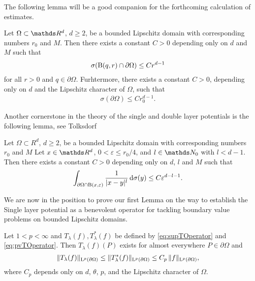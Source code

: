 The following lemma will be a good companion for the forthcoming calculation of estimates.
\begin{lem}
  \label{lem:compareBoundaryWithBall}
  Let $\Omega \subset \R^d$, $d \geq 2$, be a bounded Lipschitz domain with corresponding numbers $r_0$ and $M$.
  Then there exists a constant $C > 0$ depending only on $d$ and $M$ such that
  \begin{align*}
    \sigma(\mathrm{B}(q,r) \cap \partial\Omega) \leq C r^{d -1}
  \end{align*}
  for all $r > 0$ and $q \in \partial\Omega$.
  Furhtermore, there exists a constant $C > 0$, depending only on $d$ and the Lipschitz character of $\Omega$, such that
  \begin{align*}
    \sigma(\partial\Omega) \leq C r_0^{d - 1}.
\end{align*}
\end{lem}

Another cornerstone in the theory of the single and double layer potentials is the following lemma, see Tolksdorf \cite[Lem. 4.3.2]{tolksdorf}

\begin{lem}
  \label{lem:central}
  Let $\Omega \subset R^d$, $d \geq 2$, be a bounded Lipschitz domain with corresponding numbers $r_0$ and $M$
  Let $x \in \R^d$, $0 < \varepsilon \leq r_0/4$, and $l \in \N_0$ with $l < d - 1$.
  Then there exists a constant $C > 0$ depending only on $d$, $l$ and $M$ such that
  \begin{align*}
    \int_{\partial\Omega \cap \mathrm{B}(x, \varepsilon)} \frac{1}{|x - y|^l} \, {\operatorname{d}\!{\sigma}}(y) \leq C \varepsilon^{d - l - 1}.
  \end{align*}
\end{lem}

We are now in the position to prove our first Lemma on the way to establish the Single layer potential as a benevolent operator for tackling boundary value problems on bounded Lipschitz domains.

\begin{lem}
  \label{lem:lpBoundednessT}
  Let $1 < p < \infty$ and $T_\lambda(f), T_\lambda^*(f)$ be defined by \eqref{eq:supTOperator} and \eqref{eq:pvTOperator}.
  Then $T_\lambda(f)(P)$ exists for almost everywhere $P \in \partial\Omega$ and
  \begin{align}
    \label{eq:lpBoundednessT}
    \|T_\lambda(f) \|_{\mathrm{L}^p(\partial\Omega)}
    \leq \|T_\lambda^*(f) \|_{\mathrm{L}^p(\partial\Omega)}
    \leq C_p \, \|f\|_{\mathrm{L}^p(\partial\Omega)},
  \end{align}
  where $C_p$ depends only on $d$, $\theta$, $p$, and the Lipschitz character of $\Omega$.
\end{lem}

